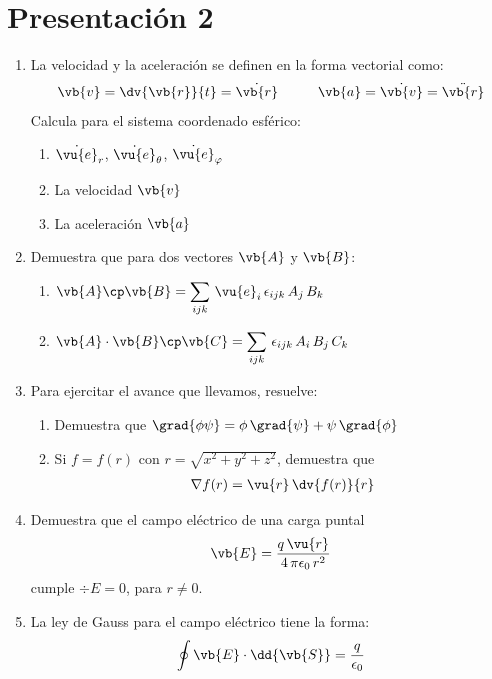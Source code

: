 \section{Presentación 2}
\begin{enumerate}
\item La velocidad y la aceleración se definen en la forma vectorial como:
\begin{align*}
\vb{v} = \dv{\vb{r}}{t} = \dot{\vb{r}} \hspace{1cm} \vb{a} = \dot{\vb{v}} = \ddot{\vb{r}}
\end{align*}
Calcula para el sistema coordenado esférico:
\begin{enumerate}
\item $\dot{\vu{e}}_{r}$, $\dot{\vu{e}}_{\theta}$, $\dot{\vu{e}}_{\varphi}$ 
\item La velocidad $\vb{v}$
\item La aceleración $\vb{a}$
\end{enumerate}
\pagebreak
\item Demuestra que para dos vectores $\vb{A}$ y $\vb{B}$:
\begin{enumerate}
\item $\vb{A} \cp \vb{B} = \displaystyle \sum_{ijk} \, \vu{e}_{i} \, \epsilon_{ijk} \, A_{j} \, B_{k}$
\item $\vb{A} \cdot \vb{B} \cp \vb{C} = \displaystyle \sum_{ijk} \, \epsilon_{ijk} \, A_{i} \, B_{j} \, C_{k}$
\end{enumerate}
\item Para ejercitar el avance que llevamos, resuelve:
\begin{enumerate}
\item Demuestra que $\grad{\phi \psi} = \phi \, \grad{\psi} + \psi \, \grad{\phi}$
\item Si $f = f(r)$ con $r = \sqrt{x^{2} + y^{2}+ z^{2}}$, demuestra que
\begin{align*}
\nabla{f(r)} = \vu{r} \, \dv{f(r)}{r}
\end{align*}
\end{enumerate}
\item Demuestra que el campo eléctrico de una carga puntal
\begin{align*}
\vb{E} = \dfrac{q \, \vu{r}}{4 \, \pi \epsilon_{0} \, r^{2}}
\end{align*}
cumple $\div{E} = 0$, para $r \neq 0$.
\item La ley de Gauss para el campo eléctrico tiene la forma:
\begin{align*}
\oint \vb{E} \cdot \dd{\vb{S}} = \dfrac{q}{\epsilon_{0}}

\end{align*}
\end{enumerate}
